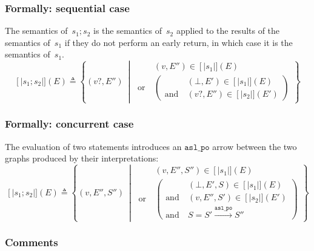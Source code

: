 \documentclass{book}
\newcommand\llbracket{[|}
\newcommand\rrbracket{|]}
\newcommand\interp[1]{\left\llbracket #1 \right\rrbracket}
\newcommand\st[0]{\ \middle|\ }
\newcommand\aslpo[0]{\mathtt{asl\_po}}
\begin{document}
  \subsubsection{Formally: sequential case}
  The semantics of~$s_1; s_2$ is the semantics of~$s_2$ applied to the results
  of the semantics of~$s_1$ if they do not perform an early return, in which
  case it is the semantics of~$s_1$.
  \begin{equation}
    \interp{s_1; s_2} (E) \triangleq
      \left\{ (v?, E'') \st{}
      \begin{aligned}
        & (v, E'') \in \interp{s_1} (E)
        \\ \text{or}\ &
        \left(
        \begin{aligned}
            & (\bot{}, E') \in \interp{s_1} (E)
            \\ \text{and}\ &
            (v?, E'') \in \interp{s_2} (E')
        \end{aligned}
        \right)
      \end{aligned}
      \right\}
    \label{eq:sem-det-sseq}
  \end{equation}

  \subsubsection{Formally: concurrent case}
  The evaluation of two statements introduces an $\aslpo$ arrow between the two
graphs produced by their interpretations:
  \begin{equation}
    \interp{s_1; s_2} (E) \triangleq
      \left\{ (v, E'', S'') \st{}
      \begin{aligned}
        & (v, E'', S'') \in \interp{s_1} (E)
        \\ \text{or}\ &
        \left(
        \begin{aligned}
            & (\bot{}, E', S) \in \interp{s_1} (E)
            \\ \text{and}\ &
            (v, E'', S') \in \interp{s_2} (E')
            \\ \text{and}\ &
            S = S' \xrightarrow{\aslpo} S''
        \end{aligned}
        \right)
      \end{aligned}
      \right\}
    \label{eq:sem-ndet-sseq}
  \end{equation}

  \subsubsection{Comments}
\end{document}
